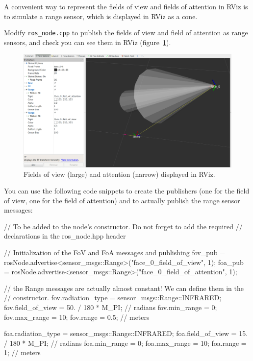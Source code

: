 \documentclass{instructions}
\begin{document}


A convenient way to represent the fields of view and fields of attention in RViz
is to simulate a range sensor, which is displayed in RViz as a cone.

Modify {\tt ros\_node.cpp} to publish the
fields of view and field of attention as range sensors, and check you can see
them in RViz (figure~\ref{fov}).

\begin{figure}
    \centering
    \includegraphics[width=0.9\linewidth]{figs/fov}
    \caption{Fields of view (large) and attention (narrow) displayed in RViz.}
    \label{fov}
\end{figure}

You can use the following code snippets to create the publishers (one for the
field of view, one for the field of attention) and to actually publish the range
sensor messages:

\begin{cppcode}
// To be added to the node's constructor. Do not forget to add the required
// declarations in the ros_node.hpp header

// Initialization of the FoV and FoA messages and publishing
fov_pub = rosNode.advertise<sensor_msgs::Range>("face_0_field_of_view", 1);
foa_pub = rosNode.advertise<sensor_msgs::Range>("face_0_field_of_attention", 1);

// the Range messages are actually almost constant! We can define them in the
// constructor.
fov.radiation_type = sensor_msgs::Range::INFRARED;
fov.field_of_view = 50. / 180 * M_PI; // radians
fov.min_range = 0;
fov.max_range = 10;
fov.range = 0.5; // meters

foa.radiation_type = sensor_msgs::Range::INFRARED;
foa.field_of_view = 15. / 180 * M_PI; // radians
foa.min_range = 0;
foa.max_range = 10;
foa.range = 1; // meters
\end{cppcode}
\end{document}
